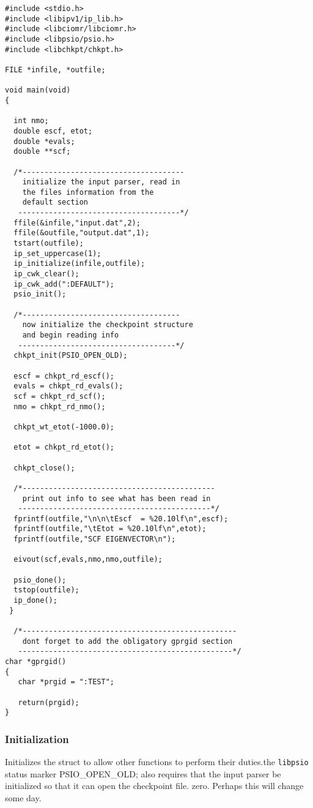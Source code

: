 \begin{verbatim}
#include <stdio.h>
#include <libipv1/ip_lib.h>
#include <libciomr/libciomr.h>
#include <libpsio/psio.h>
#include <libchkpt/chkpt.h>

FILE *infile, *outfile;

void main(void)
{
 
  int nmo;
  double escf, etot;
  double *evals;
  double **scf;

  /*-------------------------------------
    initialize the input parser, read in
    the files information from the
    default section
   -------------------------------------*/
  ffile(&infile,"input.dat",2);
  ffile(&outfile,"output.dat",1);
  tstart(outfile);
  ip_set_uppercase(1);
  ip_initialize(infile,outfile);
  ip_cwk_clear();
  ip_cwk_add(":DEFAULT");
  psio_init();

  /*------------------------------------
    now initialize the checkpoint structure
    and begin reading info
   ------------------------------------*/
  chkpt_init(PSIO_OPEN_OLD);

  escf = chkpt_rd_escf();
  evals = chkpt_rd_evals();
  scf = chkpt_rd_scf();
  nmo = chkpt_rd_nmo();
 
  chkpt_wt_etot(-1000.0);
  
  etot = chkpt_rd_etot();

  chkpt_close();

  /*--------------------------------------------
    print out info to see what has been read in
   --------------------------------------------*/
  fprintf(outfile,"\n\n\tEscf  = %20.10lf\n",escf);
  fprintf(outfile,"\tEtot = %20.10lf\n",etot);
  fprintf(outfile,"SCF EIGENVECTOR\n");

  eivout(scf,evals,nmo,nmo,outfile); 
  
  psio_done();
  tstop(outfile);
  ip_done();
 }

  /*-------------------------------------------------
    dont forget to add the obligatory gprgid section 
   -------------------------------------------------*/
char *gprgid()
{
   char *prgid = ":TEST";

   return(prgid);
}
\end{verbatim}

\subsubsection{Initialization}
{Initializes the  struct to allow other 
functions to perform their duties.}{the {\tt libpsio} status marker PSIO\_OPEN\_OLD; also requires that
the input parser be initialized so that it can open the checkpoint file.}
{zero.  Perhaps this will change some day.} \\

